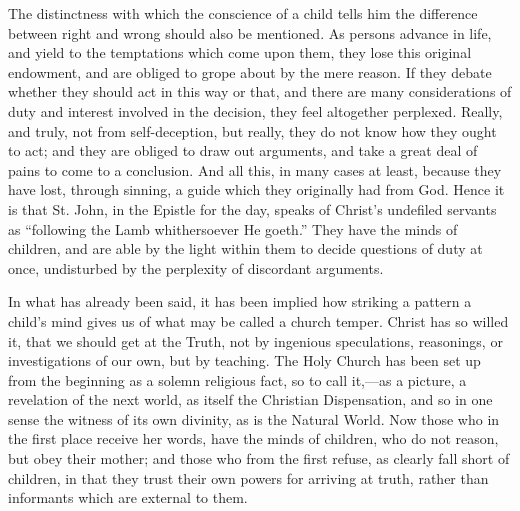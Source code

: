 The distinctness with which the conscience of a child tells him the
difference between right and wrong should also be mentioned. As
persons advance in life, and yield to the temptations which come upon
them, they lose this original endowment, and are obliged to grope
about by the mere reason. If they debate whether they should act in
this way or that, and there are many considerations of duty and
interest involved in the decision, they feel altogether perplexed.
Really, and truly, not from self-deception, but really, they do not
know how they ought to act; and they are obliged to draw out
arguments, and take a great deal of pains to come to a conclusion. And
all this, in many cases at least, because they have lost, through
sinning, a guide which they originally had from God. Hence it is that
St. John, in the Epistle for the day, speaks of Christ's undefiled
servants as ``following the Lamb whithersoever He goeth.''
They have the minds of children, and are able by the light within them
to decide questions of duty at once, undisturbed by the perplexity of
discordant arguments.

In what has already been said, it has been implied how striking a
pattern a child's mind gives us of what may be called a church temper.
Christ has so willed it, that we should get at the Truth, not by
ingenious speculations, reasonings, or investigations of our own, but
by teaching. The Holy Church has been set up from the beginning as a
solemn religious fact, so to call it,—as a picture, a revelation of
the next world, as itself the Christian Dispensation, and so in one
sense the witness of its own divinity, as is the Natural World. Now
those who in the first place receive her words, have the minds of
children, who do not reason, but obey their mother; and those who from
the first refuse, as clearly fall short of children, in that they
trust their own powers for arriving at truth, rather than informants
which are external to them.

